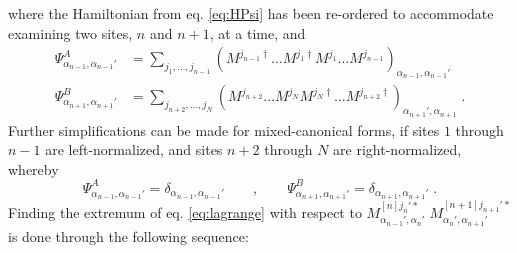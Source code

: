 where the Hamiltonian from eq. \eqref{eq:HPsi} has been re-ordered to accommodate examining two sites, $n$ and $n+1$, at a time, and 
\begin{align}
\Psi_{\alpha_{n-1},\alpha_{n-1}'}^{A} &= \sum_{j_1 , \ldots , j_{n-1}} \left( M^{j_{n-1} \dag} \ldots M^{j_{1} \dag} M^{j_1} \ldots M^{j_{n-1}} \right) _{\alpha_{n-1} , \alpha_{n-1} '} \label{eq:psiA} \\
\Psi_{\alpha_{n+1},\alpha_{n+1}'}^{B} &= \sum_{j_{n+2} , \ldots , j_{N}} \left( M^{j_{n+2} } \ldots M^{j_{N} } M^{j_N \dag} \ldots M^{j_{n+2} \dag} \right) _{\alpha_{n+1} ', \alpha_{n+1} } \; .
\end{align}
Further simplifications can be made for mixed-canonical forms, if sites $1$ through $n-1$ are left-normalized, and sites $n+2$ through $N$ are right-normalized, whereby
\begin{equation}
	\Psi_{\alpha_{n-1},\alpha_{n-1}'}^{A} = \delta_{\alpha_{n-1},\alpha_{n-1}'} \qquad , \qquad \Psi_{\alpha_{n+1},\alpha_{n+1}'}^{B} = \delta_{\alpha_{n+1},\alpha_{n+1}'} \; .
\end{equation}
Finding the extremum of eq. \eqref{eq:lagrange} with respect to $M_{\alpha_{n-1} ' , \alpha_{n} '}^{[n] j_n ' *} \; M_{\alpha_{n} ' , \alpha_{n+1} '}^{[n+1] j_{n+1} ' *}$ is done through the following sequence:

